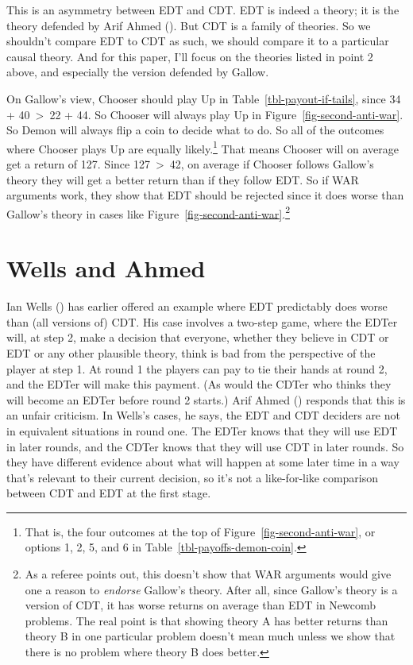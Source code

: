 \documentclass[
  11pt,
  letterpaper,
  DIV=11,
  numbers=noendperiod,
  twoside]{scrartcl}
\begin{document}
This is an asymmetry between EDT and CDT. EDT is indeed a theory; it is
the theory defended by Arif Ahmed (). But
CDT is a family of theories. So we shouldn't compare EDT to CDT as such,
we should compare it to a particular causal theory. And for this paper,
I'll focus on the theories listed in point 2 above, and especially the
version defended by Gallow.

On Gallow's view, Chooser should play Up in
Table~\ref{tbl-payout-if-tails}, since 34 + 40~\textgreater~22 + 44. So
Chooser will always play Up in Figure~\ref{fig-second-anti-war}. So
Demon will always flip a coin to decide what to do. So all of the
outcomes where Chooser plays Up are equally likely.\footnote{That is,
  the four outcomes at the top of Figure~\ref{fig-second-anti-war}, or
  options 1, 2, 5, and 6 in Table~\ref{tbl-payoffs-demon-coin}.} That
means Chooser will on average get a return of 127. Since
127~\textgreater~42, on average if Chooser follows Gallow's theory they
will get a better return than if they follow EDT. So if WAR arguments
work, they show that EDT should be rejected since it does worse than
Gallow's theory in cases like
Figure~\ref{fig-second-anti-war}.\footnote{As a referee points out, this
  doesn't show that WAR arguments would give one a reason to
  \emph{endorse} Gallow's theory. After all, since Gallow's theory is a
  version of CDT, it has worse returns on average than EDT in Newcomb
  problems. The real point is that showing theory A has better returns
  than theory B in one particular problem doesn't mean much unless we
  show that there is no problem where theory B does better.}

\section{Wells and Ahmed}\label{sec-wells-ahmed}

Ian Wells () has earlier offered an
example where EDT predictably does worse than (all versions of) CDT. His
case involves a two-step game, where the EDTer will, at step 2, make a
decision that everyone, whether they believe in CDT or EDT or any other
plausible theory, think is bad from the perspective of the player at
step 1. At round 1 the players can pay to tie their hands at round 2,
and the EDTer will make this payment. (As would the CDTer who thinks
they will become an EDTer before round 2 starts.) Arif Ahmed
() responds that this is an unfair
criticism. In Wells's cases, he says, the EDT and CDT deciders are not
in equivalent situations in round one. The EDTer knows that they will
use EDT in later rounds, and the CDTer knows that they will use CDT in
later rounds. So they have different evidence about what will happen at
some later time in a way that's relevant to their current decision, so
it's not a like-for-like comparison between CDT and EDT at the first
stage.
\end{document}
